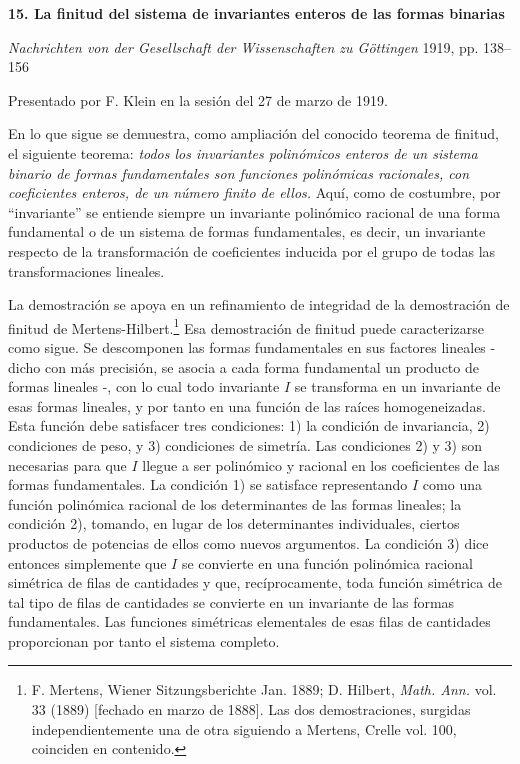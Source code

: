 \providecommand{\frH}{\mathfrak H}
\providecommand{\frK}{\mathfrak K}
\providecommand{\frM}{\mathfrak M}
\providecommand{\frN}{\mathfrak N}
\providecommand{\frG}{\mathfrak G}
\providecommand{\frS}{\mathfrak S}
\providecommand{\tmod}[1]{\;(\operatorname{mod} #1)}

\clearpage
\begin{center}
{\Large\bfseries 15. La finitud del sistema de invariantes enteros de las formas binarias}\par
\vspace{1em}
\emph{Nachrichten von der Gesellschaft der Wissenschaften zu Göttingen} 1919, pp. 138--156
\end{center}

\vspace{2em}
\begin{center}
Presentado por F. Klein en la sesión del 27 de marzo de 1919.
\end{center}

En lo que sigue se demuestra, como ampliación del conocido teorema de finitud, el siguiente teorema:
\emph{todos los invariantes polinómicos enteros de un sistema binario de formas fundamentales son funciones polinómicas racionales, con coeficientes enteros, de un número finito de ellos.}
Aquí, como de costumbre, por ``invariante'' se entiende siempre un invariante polinómico racional de una forma fundamental o de un sistema de formas fundamentales, es decir, un invariante respecto de la transformación de coeficientes inducida por el grupo de todas las transformaciones lineales.

La demostración se apoya en un refinamiento de integridad de la demostración de finitud de Mertens-Hilbert.\footnote{F. Mertens, Wiener Sitzungsberichte Jan. 1889; D. Hilbert, \emph{Math. Ann.} vol. 33 (1889) [fechado en marzo de 1888]. Las dos demostraciones, surgidas independientemente una de otra siguiendo a Mertens, Crelle vol. 100, coinciden en contenido.}
Esa demostración de finitud puede caracterizarse como sigue. Se descomponen las formas fundamentales en sus factores lineales - dicho con más precisión, se asocia a cada forma fundamental un producto de formas lineales -, con lo cual todo invariante \(I\) se transforma en un invariante de esas formas lineales, y por tanto en una función de las raíces homogeneizadas. Esta función debe satisfacer tres condiciones: 1) la condición de invariancia, 2) condiciones de peso, y 3) condiciones de simetría. Las condiciones 2) y 3) son necesarias para que \(I\) llegue a ser polinómico y racional en los coeficientes de las formas fundamentales. La condición 1) se satisface representando \(I\) como una función polinómica racional de los determinantes de las formas lineales; la condición 2), tomando, en lugar de los determinantes individuales, ciertos productos de potencias de ellos como nuevos argumentos. La condición 3) dice entonces simplemente que \(I\) se convierte en una función polinómica racional simétrica de filas de cantidades y que, recíprocamente, toda función simétrica de tal tipo de filas de cantidades se convierte en un invariante de las formas fundamentales. Las funciones simétricas elementales de esas filas de cantidades proporcionan por tanto el sistema completo.

